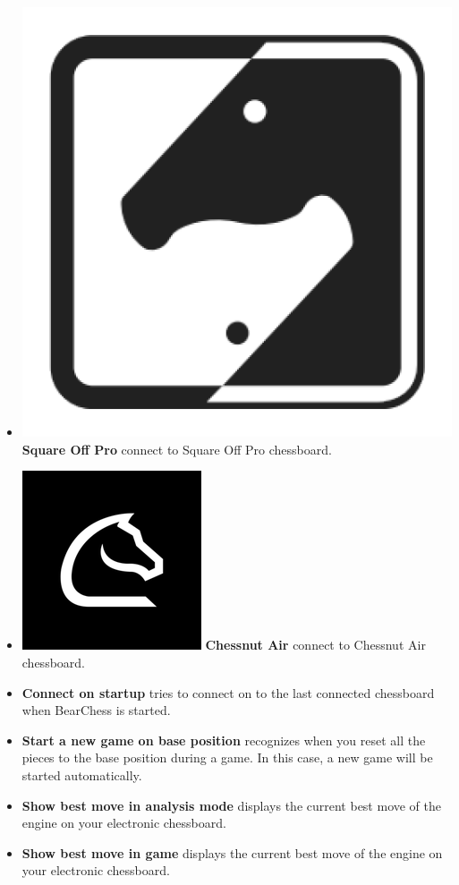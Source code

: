 \documentclass[11pt,a4paper]{article}
\begin{document}
\begin{itemize}
	\item  \includegraphics[scale=0.05]{squareoff.png} \textbf{Square Off Pro} connect to Square Off Pro chessboard.		
	\item  \includegraphics[scale=0.1]{chessnut.png} \textbf{Chessnut Air} connect to Chessnut Air chessboard.		
	\item \textbf{Connect on startup} tries to connect on to the last connected chessboard when BearChess is started. 	
	\item \textbf{Start a new game on base position} recognizes when you reset all the pieces to the base position during a game. In this case, a new game will be started automatically.
	\item \textbf{Show best move in analysis mode} displays the current best move of the engine on your electronic chessboard.
	\item \textbf{Show best move in game} displays the current best move of the engine on your electronic chessboard.	
\end{itemize}
\end{document}
